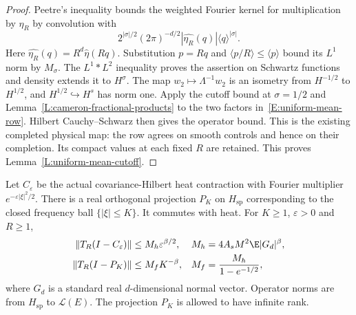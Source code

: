 \begin{proof}
  Peetre's inequality bounds the weighted Fourier kernel for
  multiplication by $\eta_R$ by convolution with
  \[
    2^{|\sigma|/2}(2\pi)^{-d/2}
    |\widehat{\eta_R}(q)|\langle q\rangle^{|\sigma|}.
  \]
  Here $\widehat{\eta_R}(q)=R^d\widehat\eta(Rq)$.
  Substitution $p=Rq$ and $\langle p/R\rangle\le\langle p\rangle$
  bound its $L^1$ norm by $M_\sigma$.
  The $L^1*L^2$ inequality proves the assertion on Schwartz
  functions and density extends it to $H^\sigma$.
  The map $w_2\mapsto\Lambda^{-1}w_2$ is an isometry from
  $H^{-1/2}$ to $H^{1/2}$, and $H^{1/2}\hookrightarrow H^s$
  has norm one. Apply the cutoff bound at $\sigma=1/2$ and
  Lemma~\ref{L:cameron-fractional-products} to the two factors
  in~\eqref{E:uniform-mean-row}. Hilbert Cauchy--Schwarz then
  gives the operator bound. This is the existing completed physical
  map: the row agrees on smooth controls and hence on their completion.
  Its compact values at each fixed $R$ are retained.
  This proves Lemma~\ref{L:uniform-mean-cutoff}.
\end{proof}

\begin{lemma}
  \label{L:uniform-mean-spatial-tails}
  Let $C_\varepsilon$ be the actual covariance-Hilbert heat
  contraction with Fourier multiplier $e^{-\varepsilon|\xi|^2/2}$.
  There is a real orthogonal projection $P_K$ on $H_{\mathrm{sp}}$
  corresponding to the closed frequency ball $\{|\xi|\le K\}$.
  It commutes with heat. For $K\ge1$, $\varepsilon>0$ and $R\ge1$,
  \begin{align}
    \|T_R(I-C_\varepsilon)\|
    &\le M_h\varepsilon^{\beta/2},
    &M_h&=4A_sM^2\E|G_d|^\beta,\label{E:uniform-mean-heat}\\
    \|T_R(I-P_K)\|
    &\le M_fK^{-\beta},
    &M_f&=\frac{M_h}{1-e^{-1/2}},\label{E:uniform-mean-frequency}
  \end{align}
  where $G_d$ is a standard real $d$-dimensional normal vector.
  Operator norms are from $H_{\mathrm{sp}}$ to $\mathcal L(E)$.
  The projection $P_K$ is allowed to have infinite rank.
\end{lemma}

